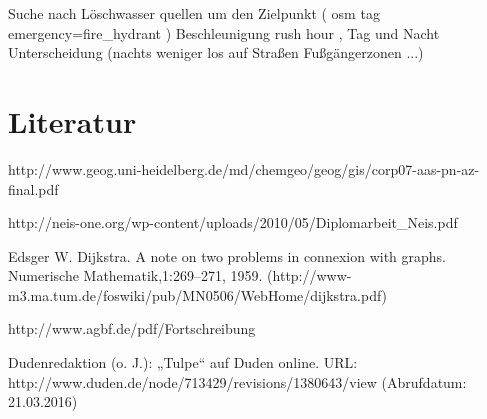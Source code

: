 \documentclass[10pt,a4paper]{article}
\begin{document}
Suche nach Löschwasser quellen um den Zielpunkt ( osm tag emergency=fire\_hydrant )
Beschleunigung
rush hour , Tag und Nacht Unterscheidung (nachts weniger los auf Straßen\/ Fußgängerzonen ...)



\section{Literatur}

http://www.geog.uni-heidelberg.de/md/chemgeo/geog/gis/corp07-aas-pn-az-final.pdf

http://neis-one.org/wp-content/uploads/2010/05/Diplomarbeit\_Neis.pdf

Edsger W. Dijkstra. A note on two problems in connexion with graphs. Numerische Mathematik,1:269–271, 1959. (http://www-m3.ma.tum.de/foswiki/pub/MN0506/WebHome/dijkstra.pdf)

http://www.agbf.de/pdf/Fortschreibung%

Dudenredaktion (o. J.): „Tulpe“ auf Duden online. URL: http://www.duden.de/node/713429/revisions/1380643/view (Abrufdatum: 21.03.2016)
\end{document}
